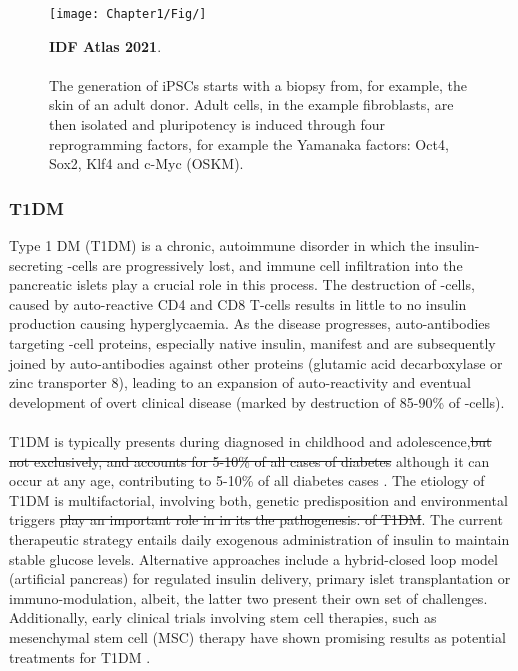\begin{figure}[t]
\centering
\texttt{[image: Chapter1/Fig/]}
\caption[diabetes]{\textbf{IDF Atlas 2021}.\\\\
The generation of iPSCs starts with a biopsy from, for example, the skin of an adult donor.
Adult cells, in the example fibroblasts, are then isolated and pluripotency is induced through four reprogramming factors, for example the Yamanaka factors: Oct4, Sox2, Klf4 and c-Myc (OSKM).}
\end{figure}

\subsubsection{T1DM}

Type 1 DM (T1DM) is a chronic, autoimmune disorder in which the insulin-secreting \textbeta-cells are progressively lost, and immune cell infiltration into the pancreatic islets play a crucial role in this process. The destruction of \textbeta-cells, caused by auto-reactive CD4 and CD8 T-cells results in little to no insulin production causing hyperglycaemia. As the disease progresses, auto-antibodies targeting \textbeta-cell proteins, especially native insulin, manifest and are subsequently joined by auto-antibodies against other proteins (glutamic acid decarboxylase or zinc transporter 8), leading to an expansion of auto-reactivity and eventual development of overt clinical disease (marked by destruction of 85-90\% of \textbeta-cells).
\\\\
T1DM is typically presents during diagnosed in childhood and adolescence,\st{but not exclusively, and accounts for 5-10\% of all cases of diabetes} although it can occur at any age, contributing to 5-10\% of all diabetes cases \textbf{\cite{banday_pathophysiology_2020}}. The etiology of T1DM is multifactorial, involving both, genetic predisposition and environmental triggers \st{play an important role in in its the pathogenesis. of T1DM}. The current therapeutic strategy entails daily exogenous administration of insulin to maintain stable glucose levels. Alternative approaches include a hybrid-closed loop model (artificial pancreas) for regulated insulin delivery, primary islet transplantation or immuno-modulation, albeit, the latter two present their own set of challenges. Additionally, early clinical trials involving stem cell therapies, such as mesenchymal stem cell (MSC) therapy have shown promising results as potential treatments for T1DM \textbf{\cite{pathak_therapies_2019}}.

